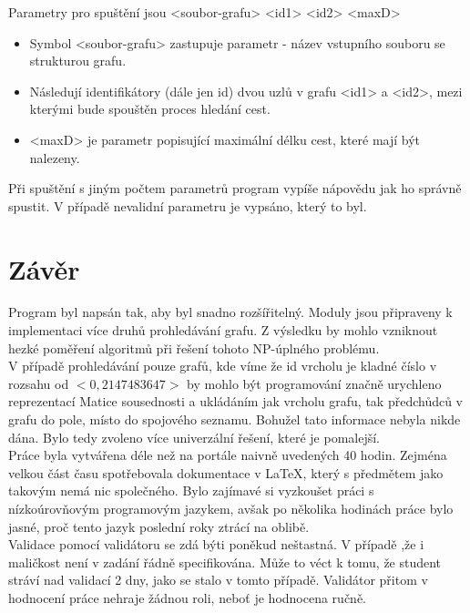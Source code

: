\documentclass[
12pt,
a4paper,
pdftex,
czech,
titlepage
]{report}
\begin{document}
Parametry pro spuštění jsou <soubor-grafu> <id1> <id2> <maxD>
\begin{itemize}
	\item Symbol <soubor-grafu> zastupuje parametr - název vstupního souboru se strukturou grafu.
	\item Následují identifikátory (dále jen id) dvou uzlů v grafu <id1> a <id2>, mezi kterými bude spouštěn proces hledání cest.
	\item <maxD> je parametr popisující maximální délku cest, které mají být nalezeny.
\end{itemize}

Při spuštění s jiným počtem parametrů program vypíše nápovědu jak ho správně spustit. V případě nevalidní parametru je vypsáno, který to byl. 

\chapter{Závěr}
Program byl napsán tak, aby byl snadno rozšířitelný. Moduly jsou připraveny k implementaci více druhů prohledávání grafu. Z výsledku by mohlo vzniknout hezké poměření algoritmů při řešení tohoto NP-úplného problému.\\
V případě prohledávání pouze grafů, kde víme že id vrcholu je kladné číslo v rozsahu od $<0,2147483647>$ by mohlo být programování značně urychleno reprezentací Matice sousednosti a ukládáním jak vrcholu grafu, tak předchůdců v grafu do pole, místo do spojového seznamu. Bohužel tato informace nebyla nikde dána. Bylo tedy zvoleno více univerzální řešení, které je pomalejší.\\
Práce byla vytvářena déle než na portále naivně uvedených 40 hodin. Zejména velkou část času spotřebovala dokumentace v \LaTeX, který s předmětem jako takovým nemá nic společného. Bylo zajímavé si vyzkoušet práci s nízkoúrovňovým programovým jazykem, avšak po několika hodinách práce bylo jasné, proč tento jazyk poslední roky ztrácí na oblibě.\\
Validace pomocí validátoru se zdá býti poněkud neštastná. V případě ,že i maličkost není v zadání řádně specifikována. Může to véct k tomu, že student stráví nad validací 2 dny, jako se stalo v tomto případě. Validátor přitom v hodnocení práce nehraje žádnou roli, neboť je hodnocena ručně.
\end{document}
